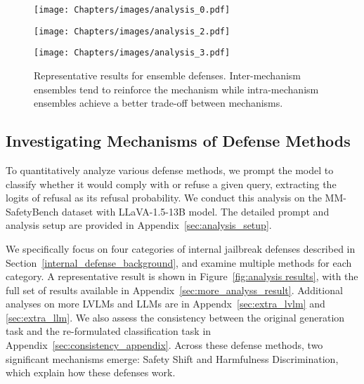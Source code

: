 \begin{figure*}[ht]
    \centering
    \begin{minipage}{0.25\textwidth} 
        \texttt{[image: Chapters/images/analysis\_0.pdf]}
    \end{minipage}\hfill 
    \begin{minipage}{0.75\textwidth} 
        \begin{minipage}{\linewidth}
            \texttt{[image: Chapters/images/analysis\_2.pdf]}
            \vspace{-6mm}
        \end{minipage}
        \vfill
        \vspace{5pt}
        \begin{minipage}{\linewidth}
            \centering
            \texttt{[image: Chapters/images/analysis\_3.pdf]}
            \vspace{-2mm}
        \end{minipage}
    \end{minipage}
    \caption{Representative results for ensemble defenses. Inter-mechanism ensembles tend to reinforce the mechanism while intra-mechanism ensembles achieve a better trade-off between mechanisms.}
    \label{fig:analysis_results}
\end{figure*}

\subsection{Investigating Mechanisms of Defense Methods}
To quantitatively analyze various defense methods, we prompt the model to classify whether it would comply with or refuse a given query, extracting the logits of refusal as its refusal probability. We conduct this analysis on the MM-SafetyBench dataset with LLaVA-1.5-13B model. The detailed prompt and analysis setup are provided in Appendix~\ref{sec:analysis_setup}. 

We specifically focus on four categories of internal jailbreak defenses described in Section~\ref{internal_defense_background}, and examine multiple methods for each category. A representative result is shown in Figure~\ref{fig:analysis results}, with the full set of results available in Appendix~\ref{sec:more_analyss_result}. Additional analyses on more LVLMs and LLMs are in Appendx~\ref{sec:extra_lvlm} and \ref{sec:extra_llm}. We also assess the consistency between the original generation task and the re-formulated classification task in Appendix~\ref{sec:consistency_appendix}.
Across these defense methods, two significant mechanisms emerge: Safety Shift and Harmfulness Discrimination, which explain how these defenses work.

